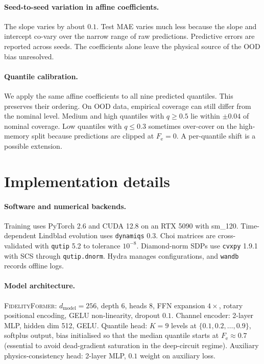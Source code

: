 \documentclass[12pt]{iopart}
\newcommand{\Fe}{F_{\mathrm{e}}}
\newcommand{\fidno}{\textsc{FidelityFormer}}
\begin{document}
\paragraph*{Seed-to-seed variation in affine coefficients.}
The slope varies by about $0.1$. Test MAE varies much less because the slope and intercept co-vary over the narrow range of raw predictions. Predictive errors are reported across seeds. The coefficients alone leave the physical source of the OOD bias unresolved.

\paragraph*{Quantile calibration.}
We apply the same affine coefficients to all nine predicted quantiles. This preserves their ordering. On OOD data, empirical coverage can still differ from the nominal level. Medium and high quantiles with $q\geq0.5$ lie within $\pm0.04$ of nominal coverage. Low quantiles with $q\leq0.3$ sometimes over-cover on the high-memory split because predictions are clipped at $\Fe=0$. A per-quantile shift is a possible extension.



\section{Implementation details}
\label{app:implementation}

\paragraph*{Software and numerical backends.}
Training uses PyTorch 2.6 and CUDA 12.8 on an RTX 5090 with sm\_120. Time-dependent Lindblad evolution uses \texttt{dynamiqs} 0.3. Choi matrices are cross-validated with \texttt{qutip} 5.2 to tolerance $10^{-8}$. Diamond-norm SDPs use \texttt{cvxpy} 1.9.1 with SCS through \texttt{qutip.dnorm}. Hydra manages configurations, and \texttt{wandb} records offline logs.

\paragraph*{Model architecture.}
\fidno{}: $d_{\mathrm{model}} = 256$, depth 6, heads 8, FFN expansion $4\times$, rotary positional encoding, GELU non-linearity, dropout $0.1$. Channel encoder: 2-layer MLP, hidden dim 512, GELU. Quantile head: $K = 9$ levels at $\{0.1, 0.2, \ldots, 0.9\}$, softplus output, bias initialised so that the median quantile starts at $\Fe \approx 0.7$ (essential to avoid dead-gradient saturation in the deep-circuit regime). Auxiliary physics-consistency head: 2-layer MLP, $0.1$ weight on auxiliary loss.
\end{document}
